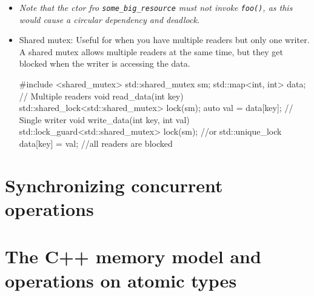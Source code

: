 \documentclass[11pt, a4paper]{article}
\theoremstyle{definition}
\theoremstyle{remark}
\newcommand{\code}[1]{\lstinline|#1|}
\begin{document}
\begin{itemize}
\begin{cppcode}
{    return res;
}
void foo() {
    get_resource()->do_something();
}
\end{cppcode}
    \item \textit{Note that the ctor fro \code{some_big_resource} must not invoke \code{foo()}, as this would cause a circular dependency and deadlock.}
    \item Shared mutex: Useful for when you have multiple readers but only one writer. A shared mutex allows multiple readers at the same time, but they get blocked when the writer is accessing the data. 
\begin{cppcode}
#include <shared_mutex>
std::shared_mutex sm;
std::map<int, int> data;
// Multiple readers
void read_data(int key) {
    std::shared_lock<std::shared_mutex> lock(sm);
    auto val = data[key];
}
// Single writer 
void write_data(int key, int val) {
    std::lock_guard<std::shared_mutex> lock(sm); //or std::unique_lock
    data[key] = val; //all readers are blocked
}
\end{cppcode}
\end{itemize}
\section{Synchronizing concurrent operations}

\section{The C++ memory model and operations on atomic types}
\end{document}
